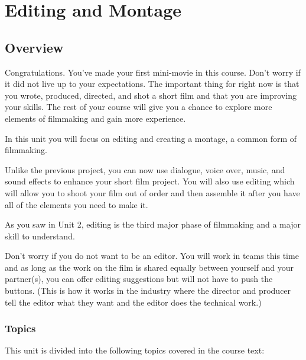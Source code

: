 \documentclass[
]{book}
\begin{document}
\hypertarget{editing-and-montage}{%
\chapter{Editing and Montage}\label{editing-and-montage}}

\hypertarget{overview-6}{%
\section*{Overview}\label{overview-6}}

Congratulations. You've made your first mini-movie in this course. Don't worry if it did not live up to your expectations. The important thing for right now is that you wrote, produced, directed, and shot a short film and that you are improving your skills. The rest of your course will give you a chance to explore more elements of filmmaking and gain more experience.

In this unit you will focus on editing and creating a montage, a common form of filmmaking.

Unlike the previous project, you can now use dialogue, voice over, music, and sound effects to enhance your short film project. You will also use editing which will allow you to shoot your film out of order and then assemble it after you have all of the elements you need to make it.

As you saw in Unit 2, editing is the third major phase of filmmaking and a major skill to understand.

Don't worry if you do not want to be an editor. You will work in teams this time and as long as the work on the film is shared equally between yourself and your partner(s), you can offer editing suggestions but will not have to push the buttons. (This is how it works in the industry where the director and producer tell the editor what they want and the editor does the technical work.)

\hypertarget{topics-6}{%
\subsection*{Topics}\label{topics-6}}

This unit is divided into the following topics covered in the course text:
\end{document}
